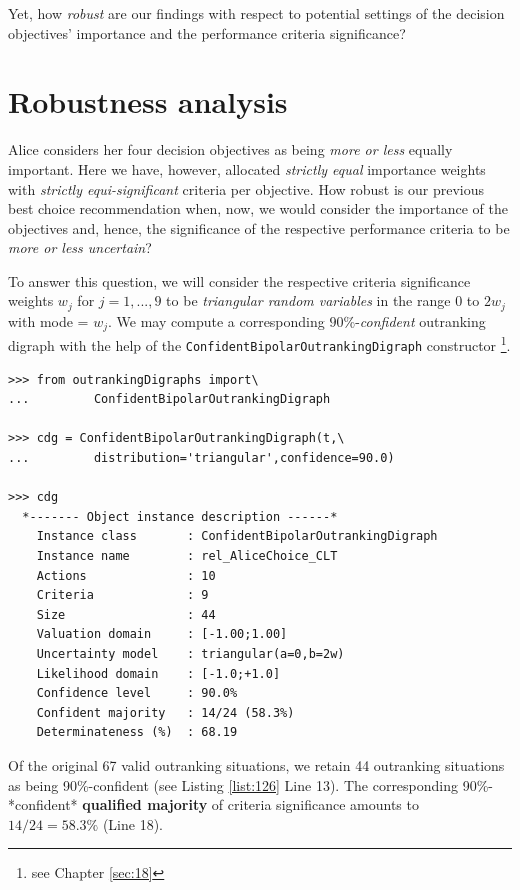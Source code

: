 Yet, how \emph{robust} are our findings with respect to potential settings of the decision objectives' importance and the performance criteria significance?
		
\section{Robustness analysis}
\label{sec:12.4}

Alice considers her four decision objectives as being \emph{more or less} equally important. Here we have, however, allocated \emph{strictly equal} importance weights with \emph{strictly equi-significant} criteria per objective. How robust is our previous best choice recommendation when, now, we would consider the importance of the objectives and, hence, the significance of the respective performance criteria to be \emph{more or less uncertain}?

To answer this question, we will consider the respective criteria significance weights $w_j$ for $j=1,...,9$ to be \emph{triangular random variables} in the range 0 to $2w_j$ with mode = $w_j$. We may compute a corresponding $90\%$-\emph{confident} outranking digraph with the help of the \texttt{ConfidentBipolarOutrankingDigraph} constructor \footnote{see Chapter \ref{sec:18}}.

\begin{lstlisting}[caption={Computing the 90\% confident outranking digraph},label=list:12.6]
>>> from outrankingDigraphs import\
...         ConfidentBipolarOutrankingDigraph

>>> cdg = ConfidentBipolarOutrankingDigraph(t,\
...         distribution='triangular',confidence=90.0)

>>> cdg
  *------- Object instance description ------*
    Instance class       : ConfidentBipolarOutrankingDigraph
    Instance name        : rel_AliceChoice_CLT
    Actions              : 10
    Criteria             : 9
    Size                 : 44
    Valuation domain     : [-1.00;1.00]
    Uncertainty model    : triangular(a=0,b=2w) 
    Likelihood domain    : [-1.0;+1.0] 
    Confidence level     : 90.0% 
    Confident majority   : 14/24 (58.3%) 
    Determinateness (%)  : 68.19
\end{lstlisting}

Of the original 67 valid outranking situations, we retain 44 outranking situations as being 90\%-confident (see Listing \ref{list:126} Line 13). The corresponding 90\%-*confident* \textbf{qualified majority} of criteria significance amounts to $14/24 = 58.3\%$ (Line 18).  

